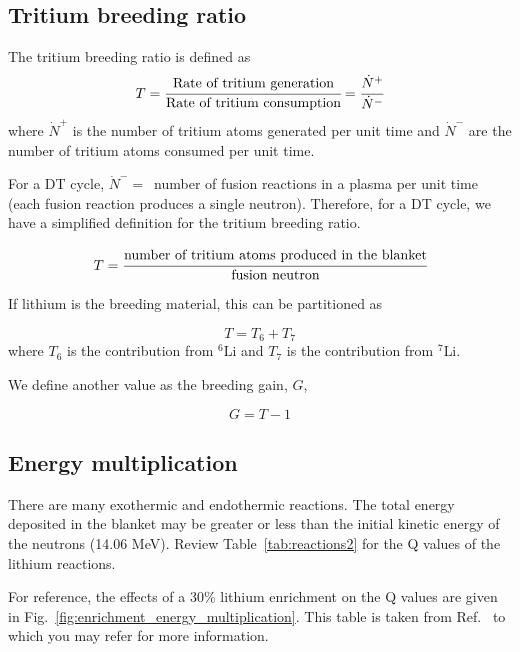 \documentclass[11pt]{report} %
\begin{document}
\subsection{Tritium breeding ratio}
The tritium breeding ratio is defined as 
\begin{equation*}
T = \cfrac{\text{Rate of tritium generation}}{\text{Rate of tritium consumption}} = \cfrac{\dot{N}^+}{\dot{N}^-}
\end{equation*}
where $\dot{N}^+$ is the number of tritium atoms generated per unit time and $\dot{N}^-$ are the number of tritium atoms consumed per unit time.

For a DT cycle, $\dot{N}^- = $~number of fusion reactions in a plasma per unit time (each fusion reaction produces a single neutron). Therefore, for a DT cycle, we have a simplified definition for the tritium breeding ratio.

\begin{equation*}
T = \cfrac{\text{number of tritium atoms produced in the blanket}}{\text{fusion neutron}}
\end{equation*}

If lithium is the breeding material, this can be partitioned as

\begin{equation}
T = T_6 + T_7
\end{equation}
where $T_6$ is the contribution from $^6$Li and $T_7$ is the contribution from $^7$Li.

We define another value as the breeding gain, $G$,

\begin{equation}
G = T - 1
\end{equation}

\subsection{Energy multiplication}
There are many exothermic and endothermic reactions. The total energy deposited in the blanket may be greater or less than the initial kinetic energy of the neutrons (14.06 MeV). Review Table~\ref{tab:reactions2} for the Q values of the lithium reactions.

For reference, the effects of a 30\% lithium enrichment on the Q values are given in Fig.~\ref{fig:enrichment_energy_multiplication}. This table is taken from Ref.~\cite{Abdou1975} to which you may refer for more information. 
\end{document}
